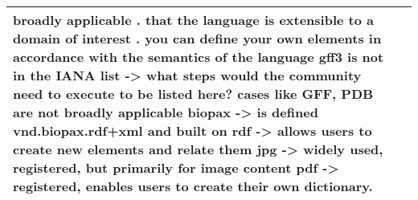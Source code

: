 \documentclass[english]{article}
\begin{document}
\begin{longtable}{|p{5cm}|p{9cm}|}
broadly applicable\newline 
. that the language is extensible to a domain of interest\newline 
. you can define your own elements in accordance with the semantics of the language\newline 
\newline 
gff3 is not in the IANA list -> what steps would the community need to execute to be listed here?
cases like GFF, PDB are not broadly applicable \newline 
biopax -> is defined vnd.biopax.rdf+xml and built on rdf -> allows users to create new elements and relate them \newline 
jpg -> widely used, registered, but primarily for image content\newline 
pdf -> registered, enables users to create their own dictionary.\newline 
 

\\
\hline

\end{longtable}


\newpage
\end{document}
